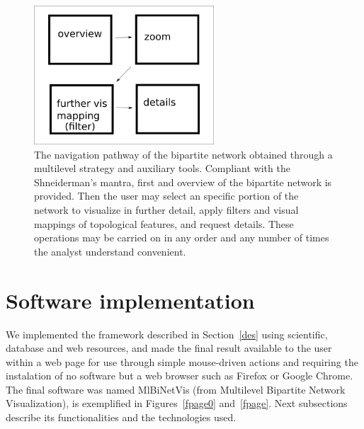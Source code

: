 \documentclass[runningheads]{llncs}
\begin{document}
\begin{figure}[!h]\centering
 \includegraphics[width=0.6\textwidth]{fnav}
  \caption{The navigation pathway of the bipartite network obtained through a multilevel strategy
  and auxiliary tools.
  Compliant with the Shneiderman's mantra, first and overview of the bipartite network is provided.
  Then the user may select an specific portion of the network to visualize in further detail,
  apply filters and visual mappings of topological features, and request details.
  These operations may be carried on in any order and any number of times the analyst understand convenient.
  }\label{fnav}
\end{figure}

\noindent 
\section{Software implementation}\label{sof}
We implemented the framework described in Section~\ref{des} using scientific,
database and web resources,
and made the final result available to the user within a web page
for use through simple mouse-driven actions
and requiring the instalation of no software but a web browser such as Firefox or Google Chrome.
The final software was named MlBiNetVis (from Multilevel Bipartite Network Visualization),
is exemplified in Figures~\ref{fpage0} and~\ref{fpage}.
Next subsections describe its functionalities and the technologies used.
\end{document}
